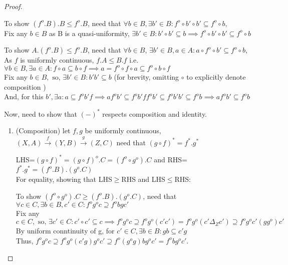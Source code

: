 \documentclass[18pt,a4paper]{article}
\theoremstyle{definition}
\begin{document}
\begin{proof}
\begin{enumerate}[label=(\roman*)]
			\end{enumerate}
		\item	To show $(f^o .B).B \leq f^o .B$, need that $\forall b \in B,
			\exists b' \in B : f^o \circ b' \circ b' \subseteq f^o \circ b$,\\
			Fix any $b \in B$ as B is a quasi-uniformity, $\exists b' \in B : b' \circ b' \subseteq b
			\implies f^o \circ b'\circ b' \subseteq f^o \circ b$

			To show $A.(f^o .B) \leq f^o .B$, need that $\forall b \in B$,
			$\exists b' \in B, a\in A : a \circ f^o \circ b' \subseteq f^o \circ b$,\\
			As $f$ is uniformly continuous, $f.A\leq B.f$ i.e. $\forall b \in B, \exists a \in A
			: f \circ a \subseteq b \circ f
			\implies a= f^o \circ f \circ a \subseteq f^o \circ  b \circ f $   \\
			Fix any $b \in B, \text{ so, } \exists b' \in B : b'b' \subseteq b$
			(for brevity, omitting $\circ$ to explicitly denote composition  )\\
			And, for this $b', \exists a : a \subseteq f^ob'f \implies af^ob' \subseteq f^ob'ff^ob'
			\subseteq f^o b'b' \subseteq f^o b \implies af^ob' \subseteq f^o b$\\
		\item	Now, need to show that $(-)^*$ respects composition and identity.
			\begin{enumerate}[label=(\roman*)]
				\item (Composition) let $f,g$ be uniformly continuous,
					$(X,A) \xrightarrow{f} (Y,B) \xrightarrow{g} (Z,C)$
					need that $(g \circ f)^*= f^*.g^* $

					LHS=$(g \circ f)^*=(g \circ f)^o .C=(f^o \circ g^o).C$ and
					RHS=$f^*.g^* =(f^o .B).(g^o .C)$\\
					For equality, showing that LHS$\geq$RHS and LHS$\leq$RHS:

					To show $(f^o \circ g^o).C\geq(f^o .B).(g^o .C)$, need that
					$\forall c \in C, \exists b \in B, c' \in C : f^og^oc
					\supseteq f^obgc'$ \\
					Fix any $c \in C, \text{ so, } \exists c' \in C: c' \circ c' \subseteq c
					\implies f^o g^o c \supseteq f^o g^o (c'c')
					=f^o g^o (c' \Delta_Z c') \supseteq f^o g^o c'(gg^o)c'$ \\
					By uniform conntinuity of g, for $c'\in C,\exists b\in B: gb\subseteq c'g $
					\\Thus, $f^o g^o c \supseteq f^o g^o (c'g)g^oc' \supseteq
					f^o (g^o g)bg^o c'=f^o bg^o c'$.


\end{enumerate}
\end{proof}
\end{document}
